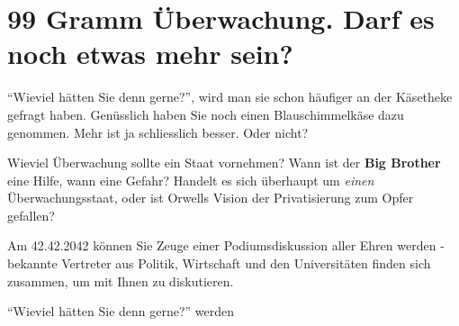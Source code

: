 \documentclass{scrartcl}
\begin{document}
\section*{99 Gramm Überwachung. Darf es noch etwas mehr sein?}
"`Wieviel hätten Sie denn gerne?"', wird man sie schon
häufiger an der Käsetheke gefragt haben. Genüsslich haben
Sie noch einen Blauschimmelkäse dazu genommen. Mehr ist ja
schliesslich besser. Oder nicht?

Wieviel Überwachung sollte ein Staat vornehmen? Wann ist
der \textbf{Big Brother} eine Hilfe, wann eine Gefahr?
Handelt es sich überhaupt um \textit{einen} Überwachungsstaat,
oder ist Orwells Vision der Privatisierung zum Opfer gefallen?

Am 42.42.2042 können Sie Zeuge einer Podiumsdiskussion aller
Ehren werden - bekannte Vertreter aus Politik, Wirtschaft
und den Universitäten finden sich zusammen, um mit Ihnen
zu diskutieren.

"`Wieviel hätten Sie denn gerne?"' werden 
\end{document}
